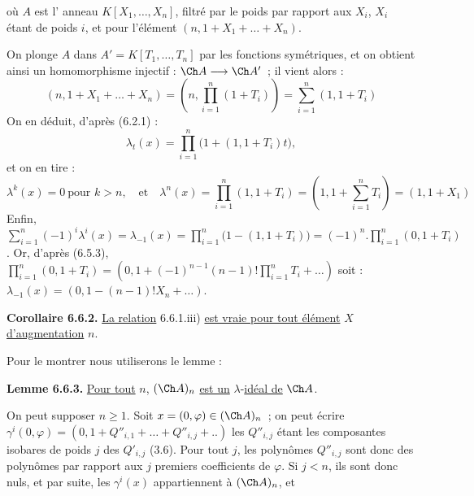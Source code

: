 
où \(A\) est l'%
anneau \(K[X_1,\ldots,X_n]\), filtré par le poids par rapport aux \(X_i\), \(X_i\) étant de poids \(i\), et pour l'élément \((n,1+X_1+\ldots+X_n)\).

On plonge \(A\) dans \(A'=K[T_1,\ldots,T_n]\) par les fonctions symétriques, et on obtient ainsi un homomorphisme injectif : \(\Ch A\longrightarrow\Ch A'\)~; il vient alors :
\[
 (n,1+X_1+\ldots+X_n)
 =
 \left(n,\prod_{i=1}^n(1+T_i)\right)
 =
 \sum_{i=1}^n(1,1+T_i)
\]
On en déduit, d'après (6.2.1) :
\[
  \lambda_t(x)=\prod_{i=1}^n\bigl(1+(1,1+T_i)t\bigr),
\]
et on en tire :
\[
  \lambda^k(x)=0\ \text{pour }k>n,\quad\text{et}\quad
  \lambda^n(x)=\prod_{i=1}^n(1,1+T_i)
   =\left(1,1+\sum_{i=1}^nT_i\right)=(1,1+X_1)
\]
Enfin, \(\sum_{i=1}^n(-1)^i\lambda^i(x)=\lambda_{-1}(x)=\prod_{i=1}^n\bigl(1-(1,1+T_i)\bigr)=(-1)^n.\prod_{i=1}^n(0,1+T_i)\).
Or, d'après (6.5.3), \(\prod_{i=1}^n(0,1+T_i)=\left(0,1+(-1)^{n-1}(n-1)!\prod_{i=1}^nT_i+\ldots\right)\)
soit : \(\lambda_{-1}(x)=(0,1-(n-1)!X_n+\ldots)\).

\textbf{Corollaire 6.6.2.} \uline{La relation} 6.6.1.iii) \uline{est vraie pour tout élément} \(X\) \uline{d'augmentation} \(n\).

Pour le montrer nous utiliserons le lemme :

\textbf{Lemme 6.6.3.} \uline{Pour tout} \(n\), \((\Ch A)_n\) \uline{est un} \(\lambda\)-\uline{idéal de} \(\Ch A\).

On peut supposer \(n\ge1\). Soit \(x=(0,\varphi)\in(\Ch A)_n\)~; on peut écrire \(\gamma^i(0,\varphi)=(0,1+Q''_{i,1}+\ldots+Q''_{i,j}+..)\) les \(Q''_{i,j}\) étant les composantes isobares de poids \(j\) des \(Q'_{i,j}\) (3.6). Pour tout \(j\), les polynômes \(Q''_{i,j}\) sont donc des polynômes par rapport aux \(j\) premiers coefficients de \(\varphi\). Si \(j<n\), ils sont donc nuls, et par suite, les \(\gamma^i(x)\) appartiennent à \((\Ch A)_n\), et 
